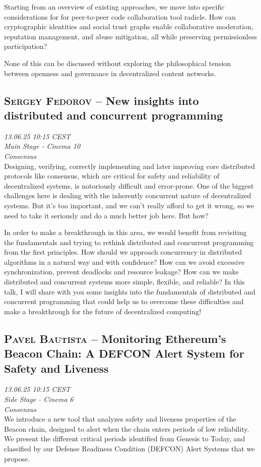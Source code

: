 Starting from an overview of existing approaches, we move into specific considerations for for peer-to-peer code collaboration tool radicle. How can cryptographic identities and social trust graphs enable collaborative moderation, reputation management, and abuse mitigation, all while preserving permissionless participation?

None of this can be discussed without  exploring the philosophical tension between openness and governance in decentralized content networks.

\clearpage
\subsection {\textsc{Sergey Fedorov}  -- New insights into distributed and concurrent programming} \noindent \textit {13.06.25 10:15 CEST\\ Main Stage - Cinema 10\\ Consensus}\\[1em] Designing, verifying, correctly implementing and later improving core distributed protocols like consensus, which are critical for safety and reliability of decentralized systems, is notoriously difficult and error-prone. One of the biggest challenges here is dealing with the inherently concurrent nature of decentralized systems. But it’s too important, and we can’t really afford to get it wrong, so we need to take it seriously and do a much better job here. But how?

In order to make a breakthrough in this area, we would benefit from revisiting the fundamentals and trying to rethink distributed and concurrent programming from the first principles. How should we approach concurrency in distributed algorithms in a natural way and with confidence? How can we avoid excessive synchronization, prevent deadlocks and resource leakage? How can we make distributed and concurrent systems more simple, flexible, and reliable? In this talk, I will share with you some insights into the fundamentals of distributed and concurrent programming that could help us to overcome these difficulties and make a breakthrough for the future of decentralized computing!

\clearpage
\subsection {\textsc{Pavel Bautista}  -- Monitoring Ethereum’s Beacon Chain: A DEFCON Alert System for Safety and Liveness} \noindent \textit {13.06.25 10:15 CEST\\ Side Stage - Cinema 6\\ Consensus}\\[1em] We introduce a new tool that analyzes safety and liveness properties of the Beacon chain, designed to alert when the chain enters periods of low reliability. We present the different critical periods identified from Genesis to Today, and classified by our Defense Readiness Condition (DEFCON) Alert Systems that we propose.

